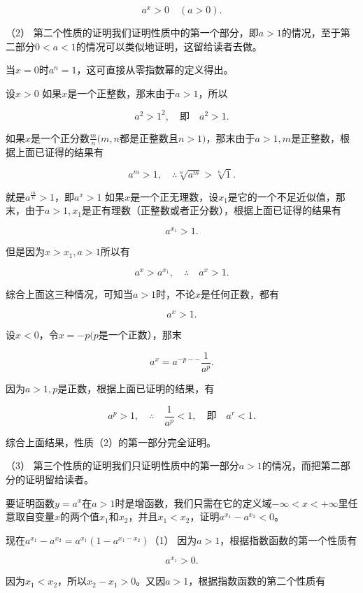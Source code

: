 \[
a^{x} > 0 \quad (a > 0).
\]

（2）
第二个性质的证明我们证明性质中的第一个部分，即\(a > 1\)的情况，至于第二部分\(0 < a < 1\)的情况可以类似地证明，这留给读者去做。

当\(x = 0\)时\(a^n = 1\)，这可直接从零指数幂的定义得出。

设\(x > 0\) 如果\(x\)是一个正整数，那末由于\(a > 1\)，所以

\[
a^{2} > 1^{2}, \quad \text{即} \quad a^{2} > 1.
\]

如果\(x\)是一个正分数\(\frac{m}{n} (m, n\)都是正整数且\(n > 1)\)，那末由于\(a > 1, m\)是正整数，根据上面已证得的结果有

\[
a^{m} > 1, \quad \therefore \sqrt[n]{a^{m}} > \sqrt[n]{1}.
\]

就是\(a^{\frac{m}{n}} > 1\)，即\(a^x > 1\)
如果\(x\)是一个正无理数，设\(x_{1}\)是它的一个不足近似值，那末，由于\(a > 1, x_{1}\)是正有理数（正整数或者正分数），根据上面已证得的结果有

\[
a^{x_{1}} > 1.
\]

但是因为\(x > x_{1}, a > 1\)所以有

\[
a^{x} > a^{x_{1}}, \quad \therefore \quad a^{x} > 1.
\]

综合上面这三种情况，可知当\(a > 1\)时，不论\(x\)是任何正数，都有

\[
a^{x} > 1.
\]

设\(x < 0\)，令\(x = -p(p\)是一个正数），那末

\[
a^{x} = a^{- p - -} \frac{1}{a^{p}}.
\]

因为\(a > 1, p\)是正数，根据上面已证明的结果，有

\[
a^{p} > 1, \quad \therefore \quad \frac{1}{a^{p}} < 1, \quad \text{即} \quad a^{r} < 1.
\]

综合上面结果，性质（2）的第一部分完全证明。

（3）
第三个性质的证明我们只证明性质中的第一部分\(a > 1\)的情况，而把第二部分的证明留给读者。

要证明函数\(y = a^x\)在\(a > 1\)时是增函数，我们只需在它的定义域\(-\infty < x < +\infty\)里任意取自变量\(x\)的两个值\(x_1\)和\(x_2\)，并且\(x_1 < x_2\)，证明\(a^{x_1} - a^{x_2} < 0\)。

现在\(a^{x_1} - a^{x_2} = a^{x_1}(1 - a^{x_1 - x_2})\)（1）
因为\(a > 1\)，根据指数函数的第一个性质有

\[
a^{x_{1}} > 0. \tag {2}
\]

因为\(x_{1} < x_{2}\)，所以\(x_{2} - x_{1} > 0\)。又因\(a > 1\)，根据指数函数的第二个性质有

